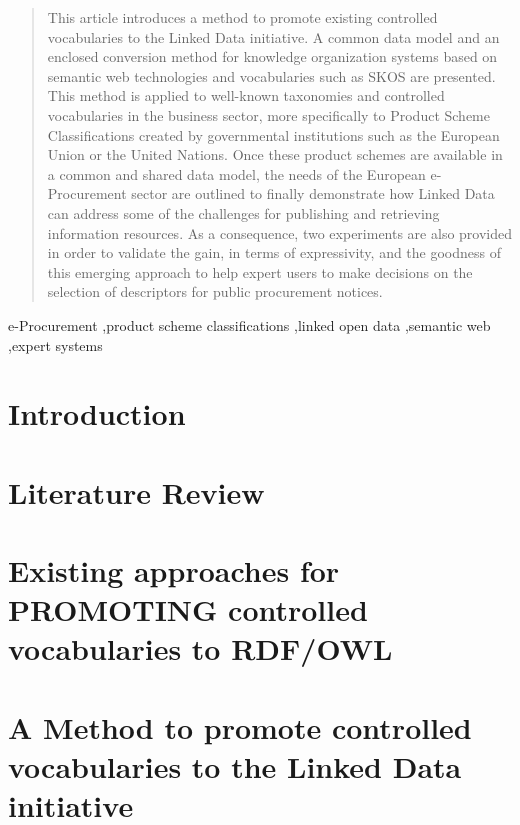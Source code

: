 \documentclass[preprint,12pt]{elsarticle}
\begin{document}
\begin{frontmatter}
\begin{abstract}
This article introduces a method to promote existing controlled vocabularies to 
the Linked Data initiative. A common data model and an enclosed conversion 
method for knowledge organization systems based on semantic web technologies and 
vocabularies such as SKOS are presented.  This method is applied to well-known 
taxonomies and controlled vocabularies in the business sector, more specifically 
to Product Scheme Classifications created by governmental institutions such as 
the European Union or the United Nations. Once these product schemes are 
available in a common and shared data model, the needs of the European 
e-Procurement sector are outlined to finally demonstrate how Linked Data can 
address some of the challenges for publishing and retrieving information 
resources. As a consequence, two experiments are also provided in order to 
validate the gain, in terms of expressivity, and the goodness of this emerging 
approach to help expert users to make decisions on the selection of descriptors 
for public procurement notices.
\end{abstract}

\begin{keyword}
e-Procurement \sep product scheme classifications \sep  linked open data \sep  semantic web \sep expert systems


\end{keyword}


\end{frontmatter}


\section{Introduction}

\section{Literature Review}\label{sect:related-work}

\section{Existing approaches for PROMOTING controlled vocabularies to RDF/OWL}\label{sect:thesauri}

\section{A Method to promote controlled vocabularies to the Linked Data initiative}\label{sect:method}

\end{document}
